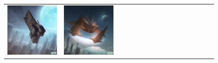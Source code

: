 \begin{figure}[ht!]
\begin{adjustwidth}{-0.8in}{-0.5in}
\begin{tabular}{cccccccccccccccccccc}
\multicolumn{3}{c}{\includegraphics[width=\twobytwocolwidth\textwidth]{figures/cherries/spaceship3.jpg}} &
\multicolumn{3}{c}{\includegraphics[width=\twobytwocolwidth\textwidth]{figures/cherries/spaceship4.jpg}} &&

\end{tabular}
\end{adjustwidth}
\end{figure}
